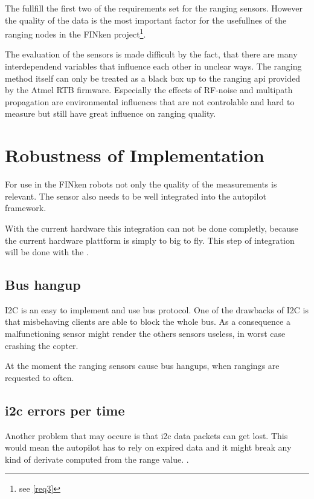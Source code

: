The  fullfill the first two of the requirements set for the ranging sensors.
However the quality of the data is the most important factor for the usefullnes of the ranging nodes in the FINken project\footnote{see \autoref{req3}}.

The evaluation of the sensors is made difficult by the fact, that there are many interdependend variables that influence each other in unclear ways.
The ranging method itself can only be treated as a black box up to the ranging api provided by the Atmel RTB firmware.
Especially the effects of RF-noise and multipath propagation are environmental influences that are not controlable and hard to measure but still have great influence on ranging quality.

\section{Robustness of Implementation}

For use in the FINken robots not only the quality of the measurements is relevant.
The sensor also needs to be well integrated into the autopilot framework.

With the current hardware this integration can not be done completly, because the current hardware plattform is simply to big to fly.
This step of integration will be done with the .

\subsection{Bus hangup}
I2C is an easy to implement and use bus protocol.
One of the drawbacks of I2C is that misbehaving clients are able to block the whole bus.
As a consequence a malfunctioning sensor might render the others sensors useless, in worst case crashing the copter.

At the moment the ranging sensors cause bus hangups, when rangings are requested to often.

\subsection{i2c errors per time}
Another problem that may occure is that i2c data packets can get lost.
This would mean the autopilot has to rely on expired data and it might break any kind of derivate computed from the range value. .


